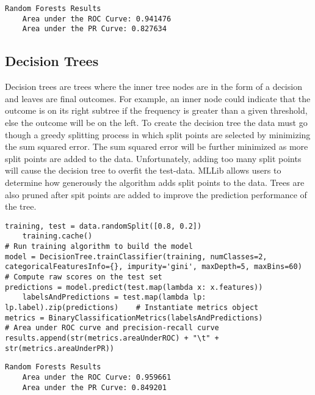 \documentclass[9pt,twocolumn,twoside]{idsi}
\begin{document}
\begin{lstlisting}
Random Forests Results
	Area under the ROC Curve: 0.941476
	Area under the PR Curve: 0.827634
\end{lstlisting}

\subsection{Decision Trees}
Decision trees are trees where the inner tree nodes are in the form of a decision and leaves are final outcomes. For example, an inner node could indicate that the outcome is on its right subtree if the frequency is greater than a given threshold, else the outcome will be on the left. To create the decision tree the data must go though a greedy splitting process in which split points are selected by minimizing the sum squared error.\cite{csahin2011detecting,decisiontrees} The sum squared error will be further minimized as more split points are added to the data. Unfortunately, adding too many split points will cause the decision tree to overfit the test-data. MLLib allows users to determine how generously the algorithm adds split points to the data. Trees are also pruned after spit points are added to improve the prediction performance of the tree.

\begin{lstlisting}
training, test = data.randomSplit([0.8, 0.2])
    training.cache()
# Run training algorithm to build the model
model = DecisionTree.trainClassifier(training, numClasses=2, categoricalFeaturesInfo={}, impurity='gini', maxDepth=5, maxBins=60)
# Compute raw scores on the test set
predictions = model.predict(test.map(lambda x: x.features))
    labelsAndPredictions = test.map(lambda lp: lp.label).zip(predictions)    # Instantiate metrics object
metrics = BinaryClassificationMetrics(labelsAndPredictions)
# Area under ROC curve and precision-recall curve
results.append(str(metrics.areaUnderROC) + "\t" + str(metrics.areaUnderPR))
\end{lstlisting} 
	
\begin{lstlisting}
Random Forests Results
	Area under the ROC Curve: 0.959661
	Area under the PR Curve: 0.849201
\end{lstlisting}

\iffalse

\section{Intuition behind Machine Learning Algorithms Chosen}
Due to the topic of credit card fraud detection, we are dealing with a classification algorithm to accurately predict fraud. 
In this paper, the focus is on Logistic Regression and Linear SVMs as the PR and ROC curve can be generated. The next step would be using Spark Streaming while making predictions using these machine learning algorithms.  
\fi
\end{document}
